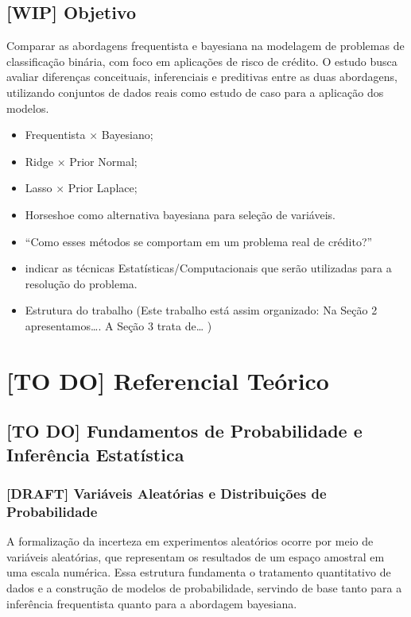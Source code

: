 \documentclass[
  brazilian,
  12pt,
  letterpaper,
  DIV=11,
  numbers=noendperiod]{scrartcl}
\begin{document}
\subsection{{[}WIP{]} Objetivo}\label{wip-objetivo}

Comparar as abordagens frequentista e bayesiana na modelagem de
problemas de classificação binária, com foco em aplicações de risco de
crédito. O estudo busca avaliar diferenças conceituais, inferenciais e
preditivas entre as duas abordagens, utilizando conjuntos de dados reais
como estudo de caso para a aplicação dos modelos.

\begin{itemize}
\item
  Frequentista × Bayesiano;
\item
  Ridge × Prior Normal;
\item
  Lasso × Prior Laplace;
\item
  Horseshoe como alternativa bayesiana para seleção de variáveis.
\item
  ``Como esses métodos se comportam em um problema real de crédito?''
\item
  indicar as técnicas Estatísticas/Computacionais que serão utilizadas
  para a resolução do problema.
\item
  Estrutura do trabalho (Este trabalho está assim organizado: Na Seção 2
  apresentamos\ldots. A Seção 3 trata de\ldots{} )
\end{itemize}

\section{{[}TO DO{]} Referencial
Teórico}\label{to-do-referencial-teuxf3rico}

\subsection{{[}TO DO{]} Fundamentos de Probabilidade e Inferência
Estatística}\label{to-do-fundamentos-de-probabilidade-e-inferuxeancia-estatuxedstica}

\subsubsection{{[}DRAFT{]} Variáveis Aleatórias e Distribuições de
Probabilidade}\label{draft-variuxe1veis-aleatuxf3rias-e-distribuiuxe7uxf5es-de-probabilidade}

A formalização da incerteza em experimentos aleatórios ocorre por meio
de variáveis aleatórias, que representam os resultados de um espaço
amostral em uma escala numérica. Essa estrutura fundamenta o tratamento
quantitativo de dados e a construção de modelos de probabilidade,
servindo de base tanto para a inferência frequentista quanto para a
abordagem bayesiana.
\end{document}
